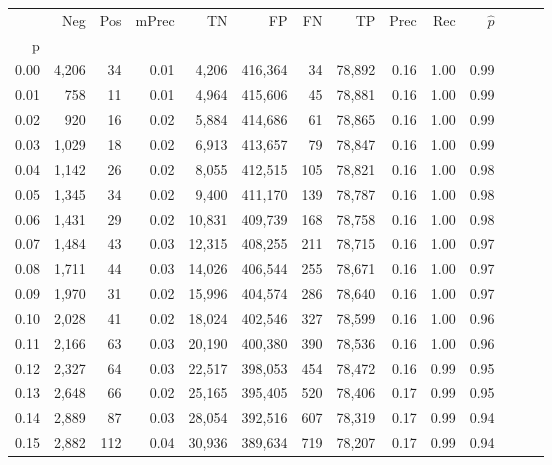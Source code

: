 \begin{tabular}{rrrrrrrrrrrrrr}
\toprule
{} &    Neg &    Pos & mPrec &       TN &       FP &      FN &      TP &  Prec &   Rec & $\hat{p}$ \\
p    &        &        &       &          &          &         &         &       &       &           \\
\midrule
0.00 &  4,206 &     34 &  0.01 &    4,206 &  416,364 &      34 &  78,892 &  0.16 &  1.00 &      0.99 \\
0.01 &    758 &     11 &  0.01 &    4,964 &  415,606 &      45 &  78,881 &  0.16 &  1.00 &      0.99 \\
0.02 &    920 &     16 &  0.02 &    5,884 &  414,686 &      61 &  78,865 &  0.16 &  1.00 &      0.99 \\
0.03 &  1,029 &     18 &  0.02 &    6,913 &  413,657 &      79 &  78,847 &  0.16 &  1.00 &      0.99 \\
0.04 &  1,142 &     26 &  0.02 &    8,055 &  412,515 &     105 &  78,821 &  0.16 &  1.00 &      0.98 \\
0.05 &  1,345 &     34 &  0.02 &    9,400 &  411,170 &     139 &  78,787 &  0.16 &  1.00 &      0.98 \\
0.06 &  1,431 &     29 &  0.02 &   10,831 &  409,739 &     168 &  78,758 &  0.16 &  1.00 &      0.98 \\
0.07 &  1,484 &     43 &  0.03 &   12,315 &  408,255 &     211 &  78,715 &  0.16 &  1.00 &      0.97 \\
0.08 &  1,711 &     44 &  0.03 &   14,026 &  406,544 &     255 &  78,671 &  0.16 &  1.00 &      0.97 \\
0.09 &  1,970 &     31 &  0.02 &   15,996 &  404,574 &     286 &  78,640 &  0.16 &  1.00 &      0.97 \\
0.10 &  2,028 &     41 &  0.02 &   18,024 &  402,546 &     327 &  78,599 &  0.16 &  1.00 &      0.96 \\
0.11 &  2,166 &     63 &  0.03 &   20,190 &  400,380 &     390 &  78,536 &  0.16 &  1.00 &      0.96 \\
0.12 &  2,327 &     64 &  0.03 &   22,517 &  398,053 &     454 &  78,472 &  0.16 &  0.99 &      0.95 \\
0.13 &  2,648 &     66 &  0.02 &   25,165 &  395,405 &     520 &  78,406 &  0.17 &  0.99 &      0.95 \\
0.14 &  2,889 &     87 &  0.03 &   28,054 &  392,516 &     607 &  78,319 &  0.17 &  0.99 &      0.94 \\
0.15 &  2,882 &    112 &  0.04 &   30,936 &  389,634 &     719 &  78,207 &  0.17 &  0.99 &      0.94 \\

\end{tabular}
